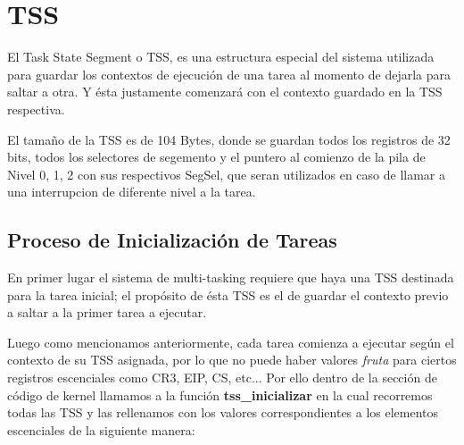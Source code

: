 \section{TSS}
\par{El Task State Segment o TSS, es una estructura especial del sistema utilizada para guardar los contextos de ejecución de una tarea al momento de dejarla para saltar a otra. Y ésta justamente comenzará con el contexto guardado en la TSS respectiva.}
\par{ El tamaño de la TSS es de 104 Bytes, donde se guardan todos los registros de 32 bits, todos los selectores de segemento y el puntero al comienzo de la pila de Nivel 0, 1, 2 con sus respectivos SegSel, que seran utilizados en caso de llamar a una interrupcion de diferente nivel a la tarea.}

\subsection{Proceso de Inicialización de Tareas}
\par{En primer lugar el sistema de multi-tasking requiere que haya una TSS destinada para la tarea inicial; el propósito de ésta TSS es el de guardar el contexto previo a saltar a la primer tarea a ejecutar.}
\par{Luego como mencionamos anteriormente, cada tarea comienza a ejecutar según el contexto de su TSS asignada, por lo que no puede haber valores \textsl{fruta} para ciertos registros escenciales como CR3, EIP, CS, etc... Por ello dentro de la sección de código de kernel llamamos a la función \textbf{tss\_inicializar} en la cual recorremos todas las TSS y las rellenamos con los valores correspondientes a los elementos escenciales de la siguiente manera:  }

